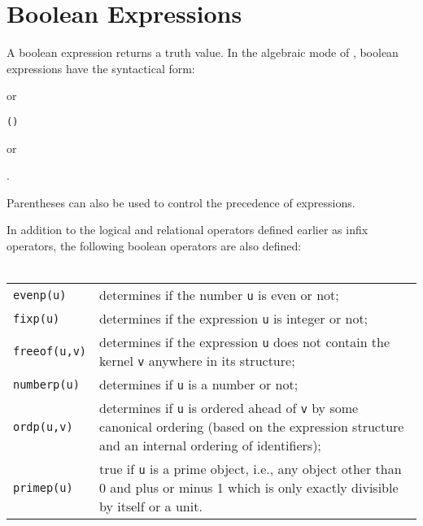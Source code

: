 \section{Boolean Expressions}
\label{sec-boolean}
A boolean expression returns
a truth value.  In the
algebraic mode of {\REDUCE}, boolean expressions have the syntactical form:
\begin{syntax}
          
\end{syntax}
or
\begin{syntax}
        \texttt{(}\texttt{)}
\end{syntax}
or
\begin{syntax}
         
        .
\end{syntax}
Parentheses can also be used to control the precedence of expressions.

\hypertarget{operator:EVENP}{}
\hypertarget{operator:FIXP}{}
\hypertarget{operator:FREEOF}{}
\hypertarget{operator:NUMBERP}{}
\hypertarget{operator:ORDP}{}
\hypertarget{operator:PRIMEP}{}
In addition to the logical and relational operators defined earlier as
infix operators, the following boolean operators are also defined:\\
\mbox{}\\
{\renewcommand{\arraystretch}{2}
\begin{tabular}{lp{\redboxwidth}}
\texttt{evenp(u)} & determines if the number \texttt{u} is even or not; \\

\texttt{fixp(u)} & determines if the expression \texttt{u} is integer or not; \\

\texttt{freeof(u,v)} & determines if the expression
\texttt{u} does not contain the kernel \texttt{v} anywhere in its
structure; \\

\texttt{numberp(u)} & determines if \texttt{u} is a number or not; \\

\texttt{ordp(u,v)} & determines if \texttt{u} is ordered
ahead of \texttt{v} by some canonical ordering (based on the expression structure
and an internal ordering of identifiers); \\

\texttt{primep(u)} & true if \texttt{u} is a prime object, i.e., any object
other than 0 and plus or minus 1 which is only exactly divisible
by itself or a unit.
 \\
\end{tabular}}

